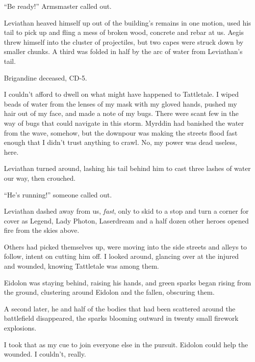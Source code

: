 ``Be ready!'' Armsmaster called out.



Leviathan heaved himself up out of the building's remains in one motion, used his tail to pick up and fling a mess of broken wood, concrete and rebar at us.  Aegis threw himself into the cluster of projectiles, but two capes were struck down by smaller chunks.  A third was folded in half by the arc of water from Leviathan's tail.



Brigandine deceased, CD-5.



I couldn't afford to dwell on what might have happened to Tattletale.  I wiped beads of water from the lenses of my mask with my gloved hands, pushed my hair out of my face, and made a note of my bugs.  There were scant few in the way of bugs that could navigate in this storm.  Myrddin had banished the water from the wave, somehow, but the downpour was making the streets flood fast enough that I didn't trust anything to crawl.  No, my power was dead useless, here.



Leviathan turned around, lashing his tail behind him to cast three lashes of water our way, then crouched.



``He's running!'' someone called out.



Leviathan dashed away from us, \emph{fast}, only to skid to a stop and turn a corner for cover as Legend, Lady Photon, Laserdream and a half dozen other heroes opened fire from the skies above.



Others had picked themselves up, were moving into the side streets and alleys to follow, intent on cutting him off.  I looked around, glancing over at the injured and wounded, knowing Tattletale was among them.



Eidolon was staying behind, raising his hands, and green sparks began rising from the ground, clustering around Eidolon and the fallen, obscuring them.



A second later, he and half of the bodies that had been scattered around the battlefield disappeared, the sparks blooming outward in twenty small firework explosions.



I took that as my cue to join everyone else in the pursuit.  Eidolon could help the wounded.  I couldn't, really.



